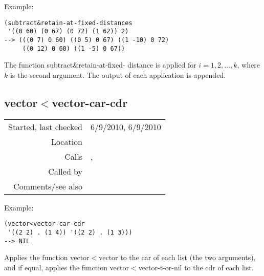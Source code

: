 \vspace{0.5cm}
\noindent Example:
\begin{verbatim}
(subtract&retain-at-fixed-distances
 '((0 60) (0 67) (0 72) (1 62)) 2)
--> (((0 7) 0 60) ((0 5) 0 67) ((1 -10) 0 72)
     ((0 12) 0 60) ((1 -5) 0 67))
\end{verbatim}

\noindent The function subtract\&retain-at-fixed-
distance is applied for $i = 1, 2,\ldots, k$, where
$k$ is the second argument. The output of each
application is appended.


\subsection*{vector$<$vector-car-cdr}\label{fun:vector<vector-car-cdr}

\vspace{0.3cm}
\begin{tabular}{r|p{8cm}}
Started, last checked & 6/9/2010, 6/9/2010 \\
Location & \nameref{sec:superdiagonals} \\
Calls & \nameref{fun:vector<vector}, \nameref{fun:vector<vector-t-or-nil} \\
Called by & \nameref{fun:merge-sort-by} \\
Comments/see also & 
\end{tabular}

\vspace{0.5cm}
\noindent Example:
\begin{verbatim}
(vector<vector-car-cdr
 '((2 2) . (1 4)) '((2 2) . (1 3)))
--> NIL
\end{verbatim}

\noindent Applies the function vector$<$vector to the
car of each list (the two arguments), and if equal,
applies the function vector$<$vector-t-or-nil to the
cdr of each list.










